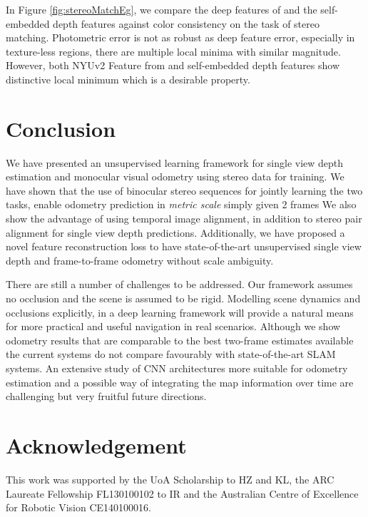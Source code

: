 \documentclass[10pt,twocolumn,letterpaper]{article}
\begin{document}
In Figure \ref{fig:stereoMatchEg}, we compare the deep features of \cite{weerasekera2017feature} and the self-embedded depth features against color consistency on the task of stereo matching. Photometric error is not as robust as deep feature error, especially in texture-less regions, there are multiple local minima with similar magnitude. However, both NYUv2 Feature from \cite{weerasekera2017feature} and self-embedded depth features show distinctive local minimum which is a desirable property.


\section{Conclusion} \label{sec_conclusion}
We have presented an unsupervised learning framework for single view depth estimation and monocular visual odometry using stereo data for training. 
We have shown that the use of binocular stereo sequences for jointly learning the two tasks, enable odometry prediction in \emph{metric scale} simply given 2 frames
We also show the advantage of using temporal image alignment, in addition to stereo pair alignment for single view depth predictions. %
Additionally, we have proposed a novel feature reconstruction loss to have state-of-the-art unsupervised single view depth and frame-to-frame odometry without scale ambiguity.  

There are still a number of challenges to be addressed. 
Our framework assumes no occlusion and the scene is assumed to be rigid. Modelling scene dynamics and occlusions explicitly, in a deep learning framework will provide a natural means for more practical and useful navigation in real scenarios. 
Although we show odometry results that are comparable to the best two-frame estimates available the current systems do not compare favourably with state-of-the-art SLAM systems. An extensive study of CNN architectures more suitable for odometry estimation and a possible way of integrating the map information over time are challenging but very fruitful future directions. 

\section{Acknowledgement}
This work was supported by the UoA Scholarship to HZ and KL, the ARC Laureate Fellowship FL130100102 to IR and the Australian Centre of Excellence for Robotic Vision CE140100016.

\clearpage{\small


}
\end{document}
